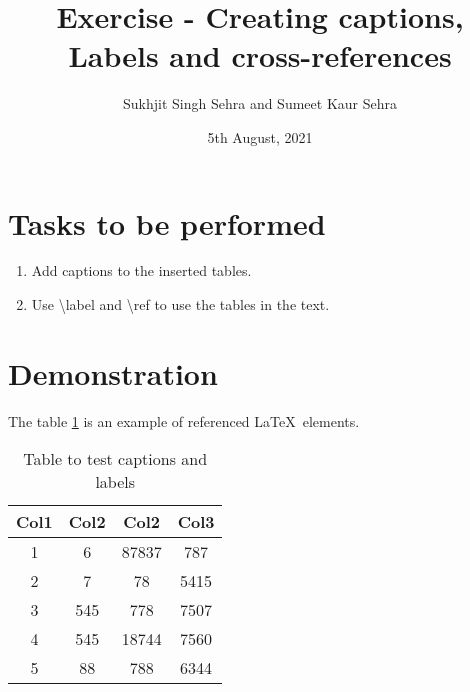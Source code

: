 \documentclass{article}
\title{Exercise - Creating captions, Labels and cross-references}
\author{Sukhjit Singh Sehra and Sumeet Kaur Sehra}
\date{5th August, 2021}
\begin{document}
	\maketitle	
	\section*{Tasks to be performed}
	\begin{enumerate}	
		\item Add captions to the inserted tables.
		\item Use \textbackslash label and \textbackslash ref to use the tables in the text.
	\end{enumerate}
	\section*{Demonstration}
		
	The table \ref{table:1} is an example of   referenced \LaTeX\ elements.
	
	\begin{table}[h!]
		\centering
		\begin{tabular}{||c c c c||} 
			\hline
			Col1 & Col2 & Col2 & Col3 \\ 
			\hline\hline
			1 & 6 & 87837 & 787 \\ 
			2 & 7 & 78 & 5415 \\
			3 & 545 & 778 & 7507 \\
			4 & 545 & 18744 & 7560 \\
			5 & 88 & 788 & 6344 \\  
			\hline
		\end{tabular}
		\caption{Table to test captions and labels}
		\label{table:1}
	\end{table}
	
	
	
	
\end{document}
